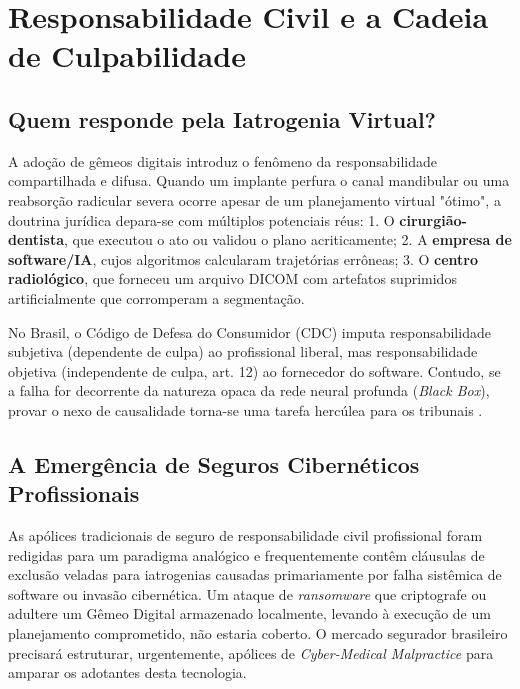 \section{Responsabilidade Civil e a Cadeia de Culpabilidade}
\label{sec:responsabilidade}

\subsection{Quem responde pela Iatrogenia Virtual?}

A adoção de gêmeos digitais introduz o fenômeno da responsabilidade compartilhada e difusa. Quando um implante perfura o canal mandibular ou uma reabsorção radicular severa ocorre apesar de um planejamento virtual "ótimo", a doutrina jurídica depara-se com múltiplos potenciais réus:
1. O \textbf{cirurgião-dentista}, que executou o ato ou validou o plano acriticamente;
2. A \textbf{empresa de software/IA}, cujos algoritmos calcularam trajetórias errôneas;
3. O \textbf{centro radiológico}, que forneceu um arquivo DICOM com artefatos suprimidos artificialmente que corromperam a segmentação.

No Brasil, o Código de Defesa do Consumidor (CDC) imputa responsabilidade subjetiva (dependente de culpa) ao profissional liberal, mas responsabilidade objetiva (independente de culpa, art. 12) ao fornecedor do software. Contudo, se a falha for decorrente da natureza opaca da rede neural profunda (\textit{Black Box}), provar o nexo de causalidade torna-se uma tarefa hercúlea para os tribunais \cite{springer2026realising}.


\subsection{A Emergência de Seguros Cibernéticos Profissionais}

As apólices tradicionais de seguro de responsabilidade civil profissional foram redigidas para um paradigma analógico e frequentemente contêm cláusulas de exclusão veladas para iatrogenias causadas primariamente por falha sistêmica de software ou invasão cibernética. Um ataque de \textit{ransomware} que criptografe ou adultere um Gêmeo Digital armazenado localmente, levando à execução de um planejamento comprometido, não estaria coberto. O mercado segurador brasileiro precisará estruturar, urgentemente, apólices de \textit{Cyber-Medical Malpractice} para amparar os adotantes desta tecnologia.

